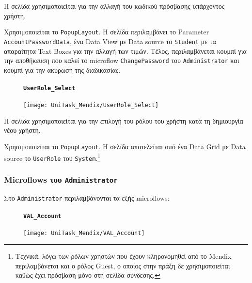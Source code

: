                     Η σελίδα χρησιμοποιείται για την αλλαγή του κωδικού πρόσβασης υπάρχοντος χρήστη.

                    Χρησιμοποιείται το \texttt{PopupLayout}. Η σελίδα περιλαμβάνει το Parameter \linebreak \texttt{AccountPasswordData}, ένα Data View με Data source το \texttt{Student} με τα απαραίτητα Text Boxes για την αλλαγή των τιμών. Τέλος, περιλαμβάνεται κουμπί για την αποθήκευση που καλεί το microflow \texttt{ChangePassword} του \texttt{Administrator} και κουμπί για την ακύρωση της διαδικασίας.

                \begin{figure}[H] \noindent
                    \paragraph{\texttt{UserRole\_Select}}
                    \begin{center}
                        \texttt{[image: UniTask\_Mendix/UserRole\_Select]}
                    \end{center}
                \end{figure}

                    Η σελίδα χρησιμοποιείται για την επιλογή του ρόλου του χρήστη κατά τη δημιουργία νέου χρήστη.

                    Χρησιμοποιείται το \texttt{PopupLayout}. Η σελίδα αποτελείται από ένα Data Grid με Data source το \texttt{UserRole} του \texttt{System}.\footnote{Τεχνικά, λόγω των ρόλων χρηστών που έχουν κληρονομηθεί από το Mendix περιλαμβάνεται και ο ρόλος Guest, ο οποίος στην πράξη δε χρησιμοποιείται καθώς έχει πρόσβαση μόνο στη σελίδα σύνδεσης.}

            \subsubsection{Microflows του \texttt{Administrator}}
                Στο \texttt{Administrator} περιλαμβάνονται τα εξής microflows:

                \begin{figure}[H] \noindent
                    \paragraph{\texttt{VAL\_Account}}
                    \begin{center}
                        \texttt{[image: UniTask\_Mendix/VAL\_Account]}
                    \end{center}
                \end{figure}

